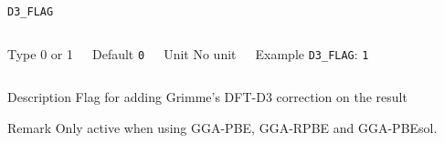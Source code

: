 \documentclass[xcolor=dvipsnames,t]{beamer}
\begin{document}
\begin{frame}[allowframebreaks]{\texttt{D3\_FLAG}} \label{D3_FLAG}
\vspace*{-12pt}
\begin{columns}
\begin{block}{Type}
0 or 1
\end{block}

\begin{block}{Default}
\texttt{0}
\end{block}

\begin{block}{Unit}
No unit
\end{block}

\begin{block}{Example}
\texttt{D3\_FLAG}: \texttt{1}
\end{block}
\end{columns}

\begin{block}{Description}
Flag for adding Grimme’s DFT-D3 correction on the result
\end{block}

\begin{block}{Remark}
Only active when using GGA-PBE, GGA-RPBE and GGA-PBEsol.
\end{block}

\end{frame}
\end{document}
